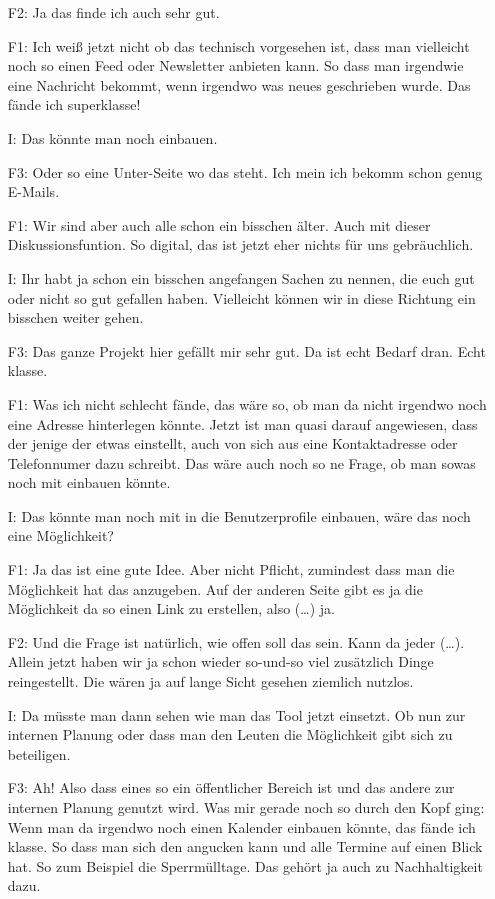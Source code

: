 \begin{itemize}
    \item[F2:] Ja das finde ich auch sehr gut.
    \item[F1:] Ich weiß jetzt nicht ob das technisch vorgesehen ist, dass man vielleicht noch so einen Feed oder Newsletter anbieten kann. So dass man irgendwie eine Nachricht bekommt, wenn irgendwo was neues geschrieben wurde. Das fände ich superklasse!
    \item[I:] Das könnte man noch einbauen.
    \item[F3:] Oder so eine Unter-Seite wo das steht. Ich mein ich bekomm schon genug E-Mails.
    \item[F1:] Wir sind aber auch alle schon ein bisschen älter. Auch mit dieser Diskussionsfuntion. So digital, das ist jetzt eher nichts für uns gebräuchlich.
    \item[I:] Ihr habt ja schon ein bisschen angefangen Sachen zu nennen, die euch gut oder nicht so gut gefallen haben. Vielleicht können wir in diese Richtung ein bisschen weiter gehen.
    \item[F3:] Das ganze Projekt hier gefällt mir sehr gut. Da ist echt Bedarf dran. Echt klasse.
    \item[F1:] Was ich nicht schlecht fände, das wäre so, ob man da nicht irgendwo noch eine Adresse hinterlegen könnte. Jetzt ist man quasi darauf angewiesen, dass der jenige der etwas einstellt, auch von sich aus eine Kontaktadresse oder Telefonnumer dazu schreibt. Das wäre auch noch so ne Frage, ob man sowas noch mit einbauen könnte.
    \item[I:] Das könnte man noch mit in die Benutzerprofile einbauen, wäre das noch eine Möglichkeit?
    \item[F1:] Ja das ist eine gute Idee. Aber nicht Pflicht, zumindest dass man die Möglichkeit hat das anzugeben. Auf der anderen Seite gibt es ja die Möglichkeit da so einen Link zu erstellen, also (\dots) ja.
    \item[F2:] Und die Frage ist natürlich, wie offen soll das sein. Kann da jeder (\dots). Allein jetzt haben wir ja schon wieder so-und-so viel zusätzlich Dinge reingestellt. Die wären ja auf lange Sicht gesehen ziemlich nutzlos.
    \item[I:] Da müsste man dann sehen wie man das Tool jetzt einsetzt. Ob nun zur internen Planung oder dass man den Leuten die Möglichkeit gibt sich zu beteiligen.
    \item[F3:] Ah! Also dass eines so ein öffentlicher Bereich ist und das andere zur internen Planung genutzt wird. Was mir gerade noch so durch den Kopf ging: Wenn man da irgendwo noch einen Kalender einbauen könnte, das fände ich klasse. So dass man sich den angucken kann und alle Termine auf einen Blick hat. So zum Beispiel die Sperrmülltage. Das gehört ja auch zu Nachhaltigkeit dazu.

\end{itemize}
